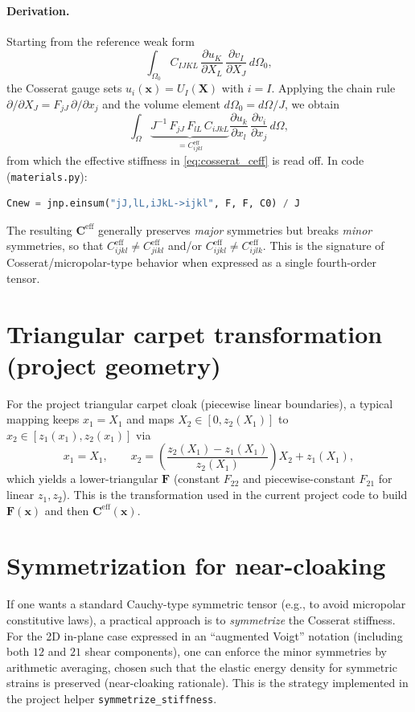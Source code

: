 \documentclass[11pt,a4paper]{report}
\begin{document}
\paragraph{Derivation.}
Starting from the reference weak form
\begin{equation}
\int_{\Omega_0} C_{IJKL}\,\frac{\partial u_K}{\partial X_L}\,\frac{\partial v_I}{\partial X_J}\,d\Omega_0,
\end{equation}
the Cosserat gauge sets $u_i(\bm x) = U_I(\bm X)$ with $i=I$.
Applying the chain rule $\partial/\partial X_J = F_{jJ}\,\partial/\partial x_j$
and the volume element $d\Omega_0 = d\Omega/J$, we obtain
\begin{equation}
\int_{\Omega} \underbrace{J^{-1}\,F_{jJ}\,F_{lL}\,C_{iJkL}}_{= C^{\mathrm{eff}}_{ijkl}}
\frac{\partial u_k}{\partial x_l}\,\frac{\partial v_i}{\partial x_j}\,d\Omega,
\end{equation}
from which the effective stiffness in \cref{eq:cosserat_ceff} is read off.
In code (\texttt{materials.py}):
\begin{lstlisting}[language=Python]
Cnew = jnp.einsum("jJ,lL,iJkL->ijkl", F, F, C0) / J
\end{lstlisting}
The resulting $\bm C^{\mathrm{eff}}$ generally preserves \emph{major} symmetries but breaks \emph{minor} symmetries, so that
$C^{\mathrm{eff}}_{ijkl} \neq C^{\mathrm{eff}}_{jikl}$ and/or $C^{\mathrm{eff}}_{ijkl} \neq C^{\mathrm{eff}}_{ijlk}$.
This is the signature of Cosserat/micropolar-type behavior when expressed as a single fourth-order tensor.

\section{Triangular carpet transformation (project geometry)}
For the project triangular carpet cloak (piecewise linear boundaries),
a typical mapping keeps $x_1=X_1$ and maps $X_2\in[0,z_2(X_1)]$ to $x_2\in[z_1(x_1),z_2(x_1)]$ via
\begin{equation}
x_1 = X_1,\qquad
x_2 = \left( \frac{z_2(X_1)-z_1(X_1)}{z_2(X_1)} \right) X_2 + z_1(X_1),
\end{equation}
which yields a lower-triangular $\bm F$ (constant $F_{22}$ and piecewise-constant $F_{21}$ for linear $z_1,z_2$).
This is the transformation used in the current project code to build $\bm F(\bm x)$ and then $\bm C^{\mathrm{eff}}(\bm x)$.

\section{Symmetrization for near-cloaking}
If one wants a standard Cauchy-type symmetric tensor (e.g., to avoid micropolar constitutive laws),
a practical approach is to \emph{symmetrize} the Cosserat stiffness. For the 2D in-plane case expressed in an
``augmented Voigt'' notation (including both $12$ and $21$ shear components), one can enforce the minor symmetries by arithmetic averaging,
chosen such that the elastic energy density for symmetric strains is preserved (near-cloaking rationale).
This is the strategy implemented in the project helper \texttt{symmetrize\_stiffness}.
\end{document}
